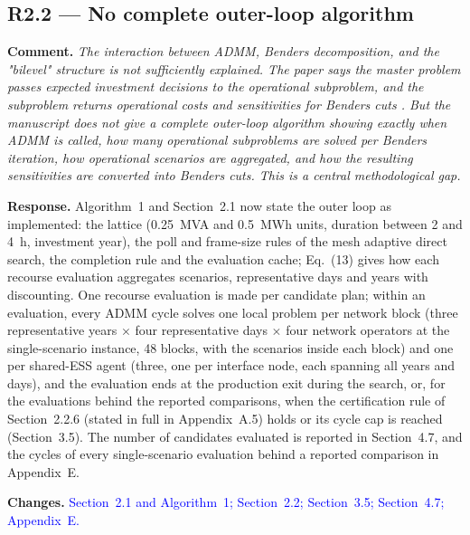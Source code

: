\documentclass[11pt]{article}
\newcommand{\rcomment}[1]{\par\medskip\noindent\textbf{Comment.} \textit{#1}\par\smallskip}
\newcommand{\rresponse}[1]{\noindent\textbf{Response.} #1\par\smallskip}
\newcommand{\rchanges}[1]{\noindent\textbf{Changes.} \textcolor{blue}{#1}\par\medskip}
\begin{document}
\subsection*{R2.2 --- No complete outer-loop algorithm}
\rcomment{The interaction between ADMM, Benders decomposition, and the "bilevel" structure is not sufficiently explained. The paper says the master problem passes expected investment decisions to the operational subproblem, and the subproblem returns operational costs and sensitivities for Benders cuts . But the manuscript does not give a complete outer-loop algorithm showing exactly when ADMM is called, how many operational subproblems are solved per Benders iteration, how operational scenarios are aggregated, and how the resulting sensitivities are converted into Benders cuts. This is a central methodological gap.}
\rresponse{Algorithm~1 and Section~2.1 now state the outer loop as implemented: the lattice (0.25~MVA and 0.5~MWh units, duration between 2 and 4~h, investment year), the poll and frame-size rules of the mesh adaptive direct search, the completion rule and the evaluation cache; Eq.~(13) gives how each recourse evaluation aggregates scenarios, representative days and years with discounting. One recourse evaluation is made per candidate plan; within an evaluation, every ADMM cycle solves one local problem per network block (three representative years $\times$ four representative days $\times$ four network operators at the single-scenario instance, 48 blocks, with the scenarios inside each block) and one per shared-ESS agent (three, one per interface node, each spanning all years and days), and the evaluation ends at the production exit during the search, or, for the evaluations behind the reported comparisons, when the certification rule of Section~2.2.6 (stated in full in Appendix~A.5) holds or its cycle cap is reached (Section~3.5). The number of candidates evaluated is reported in Section~4.7, and the cycles of every single-scenario evaluation behind a reported comparison in Appendix~E.}
\rchanges{Section~2.1 and Algorithm~1; Section~2.2; Section~3.5; Section~4.7; Appendix~E.}
\end{document}
